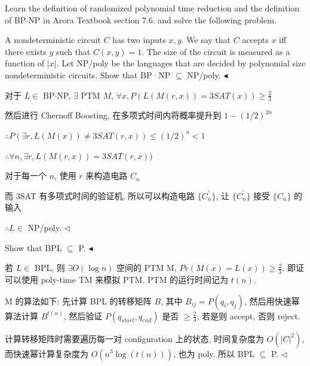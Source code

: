 \documentclass[11pt]{article}
\newenvironment{problem}[2][Problem]{\begin{trivlist}
		\item[\hskip \labelsep {\bfseries #1}\hskip \labelsep {\bfseries #2.}]}{\hfill$\blacktriangleleft$\end{trivlist}}
\newenvironment{answer}[1][Answer]{\begin{trivlist}
		\item[\hskip \labelsep {\bfseries #1.}\hskip \labelsep]}{\hfill$\lhd$\end{trivlist}}
\begin{document}
	\begin{problem}{4.(22分)}
		Learn the definition of randomized polynomial time reduction and the definition of BP$\cdot$NP in Arora Textbook section 7.6. and solve the following problem.
		
		A nondeterministic circuit $C$ has two inputs $x, y$. We say that $C$ accepts $x$ iff there exists $y$ such that $C(x, y) = 1$. The size of the circuit is measured as a function of $|x|$. Let NP/poly be the languages that are decided by polynomial size nondeterministic circuits. Show that BP·NP $\subseteq$ NP/poly.
	\end{problem}
	\begin{answer}
		对于 $L\in$ BP$\cdot$NP, $\exists$ PTM $M$, $\forall x,P(L(M(r,x))=3SAT(x))\geq\frac{2}{3}$
		
		然后进行 Chernoff Boosting, 在多项式时间内将概率提升到 $1-(1/2)^{2n}$
		
		$\therefore P(\exists r,L(M(x))\neq3SAT(r,x))\leq(1/2)^n<1$
		
		$\therefore \forall n,\exists r,L(M(r,x))=3SAT(r,x))$
		
		对于每一个 $n$, 使用 $r$ 来构造电路 $C_n$
		
		而 3SAT 有多项式时间的验证机, 所以可以构造电路 $\{C_n^\prime\}$, 让 $\{C_n^\prime\}$ 接受 $\{C_n\}$ 的输入
		
		$\therefore L\in$ NP/poly.
	\end{answer}
	\begin{problem}{5.(22分)}
		Show that BPL $\subseteq$ P.
	\end{problem}
	\begin{answer}
		若 $L\in$ BPL, 则 $\exists O(\log n)$ 空间的 PTM M, $Pr(M(x)=L(x))\geq\frac{2}{3}$. 即证可以使用 poly-time TM 来模拟 PTM. PTM 的运行时间记为 $t(n)$.
		
		M 的算法如下: 先计算 BPL 的转移矩阵 $B$, 其中 $B_{ij}=P(q_i,q_j)$, 然后用快速幂算法计算 $B^{t(n)}$, 然后验证 $P(q_{start},q_{end})$ 是否 $\geq\frac{2}{3}$, 若是则 accept, 否则 reject.
		
		计算转移矩阵时需要遍历每一对 configuration 上的状态, 时间复杂度为 $O(|C|^2)$, 而快速幂计算复杂度为 $O(n^3\log(t(n)))$, 也为 poly. 所以 BPL $\subseteq$ P.
	\end{answer}
\end{document}
